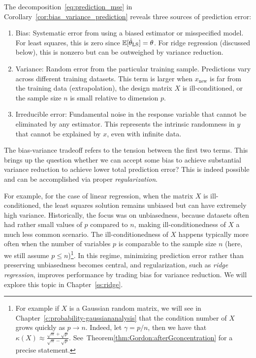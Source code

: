 The decomposition~\eqref{eq:prediction_mse} in Corollary~\ref{cor:bias_variance_prediction} reveals three sources of prediction error:
\begin{enumerate}
  \item Bias:
    Systematic error from using a biased estimator or misspecified model. For least squares, 
    this is zero since $\mathbb{E}[\hat{\theta}_{\text{LS}}] = \theta$. For ridge regression (discussed below), this 
    is nonzero but can be outweighed by variance reduction.
   \item Variance:
    Random error from the particular training sample. Predictions vary across 
    different training datasets. This term is larger when
  $x_{\text{new}}$ is far from the training data (extrapolation), the design matrix $X$ is ill-conditioned, or the sample size $n$ is small relative to dimension $p$.
    \item Irreducible error:
    Fundamental noise in the response variable that cannot be eliminated by any 
    estimator. This represents the intrinsic randomness in $y$ that cannot be 
    explained by $x$, even with infinite data.
\end{enumerate}

The bias-variance tradeoff refers to the tension between the first two terms. This brings up the question whether we can accept some bias to achieve 
substantial variance reduction to achieve lower total prediction error? This is indeed possible and can be accomplished via proper {\em regularization}.

For example, for the case of linear regression, when the matrix $X$ is ill-conditioned, the least squares solution remains unbiased but can have extremely high variance.  Historically, the focus was on unbiasedness, because datasets often had rather small values of $p$ compared to $n$, making ill-conditionedness of $X$ a much less common scenario. The ill-conditionedness of $X$
happens typically more often when the number of variables $p$ is comparable to the sample size $n$ (here, we still assume $p \le n$)\footnote{For example if $X$ is a Gaussian random matrix, we will see in Chapter~\ref{c:probability-gaussiananalysis} that the condition number of $X$ grows quickly as $p \to n$. 
Indeed, let $\gamma = p/n$, then we have that $\kappa(X) \approx \frac{\sqrt{n}+\sqrt{p}}{\sqrt{n}-\sqrt{p}}$. See~Theorem\ref{thm:Gordon:afterGconcentration} for a precise statement.}. In this regime, minimizing prediction error rather than preserving unbiasedness becomes central, and regularization, such as {\em ridge regression}, improves performance by trading bias for variance reduction.
We will explore this topic in Chapter~\ref{ss:ridge}. 

